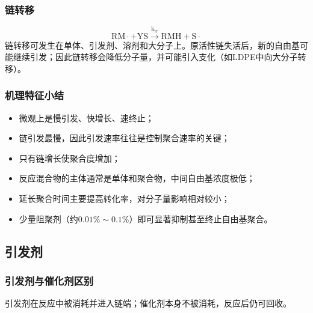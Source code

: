 ﻿\documentclass[12pt,a4paper]{article}
\begin{document}
\subsubsection{链转移}
\[
\mathrm{RM\cdot + YS \xrightarrow{k_{tr}} RMH + S\cdot}
\]
链转移可发生在单体、引发剂、溶剂和大分子上。原活性链失活后，新的自由基可能继续引发；因此链转移会降低分子量，并可能引入支化（如LDPE中向大分子转移）。

\subsubsection{机理特征小结}
\begin{itemize}
  \item 微观上是慢引发、快增长、速终止；
  \item 链引发最慢，因此引发速率往往是控制聚合速率的关键；
  \item 只有链增长使聚合度增加；
  \item 反应混合物的主体通常是单体和聚合物，中间自由基浓度极低；
  \item 延长聚合时间主要提高转化率，对分子量影响相对较小；
  \item 少量阻聚剂（约$0.01\%\sim0.1\%$）即可显著抑制甚至终止自由基聚合。
\end{itemize}

\subsection{引发剂}
\subsubsection{引发剂与催化剂区别}
引发剂在反应中被消耗并进入链端；催化剂本身不被消耗，反应后仍可回收。
\end{document}
